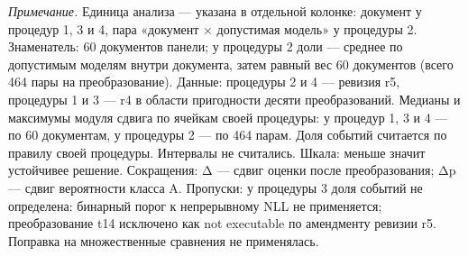 \begin{minipage}{\linewidth}\footnotesize\vspace{2pt}
\textit{Примечание.} Единица анализа — указана в отдельной колонке: документ у процедур 1, 3 и 4, пара «документ × допустимая модель» у процедуры 2. Знаменатель: 60 документов панели; у процедуры 2 доли — среднее по допустимым моделям внутри документа, затем равный вес 60 документов (всего 464 пары на преобразование). Данные: процедуры 2 и 4 — ревизия r5, процедуры 1 и 3 — r4 в области пригодности десяти преобразований. Медианы и максимумы модуля сдвига по ячейкам своей процедуры: у процедур 1, 3 и 4 — по 60 документам, у процедуры 2 — по 464 парам. Доля событий считается по правилу своей процедуры. Интервалы не считались. Шкала: меньше значит устойчивее решение. Сокращения: Δ — сдвиг оценки после преобразования; Δp — сдвиг вероятности класса A. Пропуски: у процедуры 3 доля событий не определена: бинарный порог к непрерывному NLL не применяется; преобразование t14 исключено как not executable по амендменту ревизии r5. Поправка на множественные сравнения не применялась.
\end{minipage}
\endgroup
